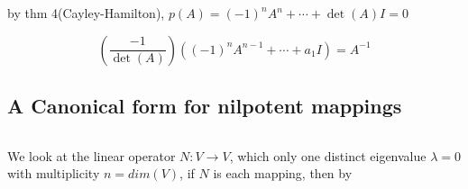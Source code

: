 by thm 4(Cayley-Hamilton), $p(A) = (-1)^nA^n + \cdots + \det(A)I = 0$

$$\left( \dfrac{-1}{\det(A)}\right)\left((-1)^nA^{n-1}+\cdots+a_1I\right) = A^{-1}$$

\subsection{A Canonical form for nilpotent mappings} $ $

We look at the linear operator $N:V \rightarrow V$, which only one distinct eigenvalue $\lambda = 0$ with multiplicity $n = dim(V)$, if $N$ is each mapping, then by 
























